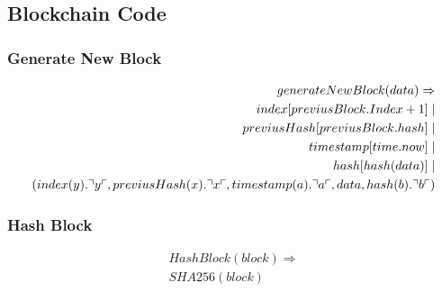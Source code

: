 \subsection{Blockchain Code}

\subsubsection{Generate New Block}

\begin{align*}
generateNewBlock(data)\Rightarrow \\
index[previusBlock.Index + 1]\mid\\
previusHash[previusBlock.hash] \mid \\
timestamp[time.now] \mid \\
hash[hash(data)] \mid \\
(index(y).\urcorner y \ulcorner, previusHash(x).\urcorner x \ulcorner, timestamp(a).\urcorner a \ulcorner, data, hash(b).\urcorner b \ulcorner)
\end{align*}

\subsubsection{Hash Block}

\begin{align*}
HashBlock(block)\Rightarrow\\
SHA256(block)\\
\end{align*}